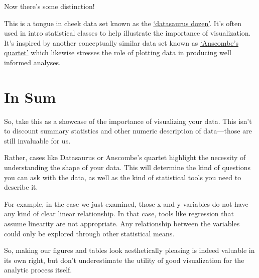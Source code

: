 \documentclass[
  letterpaper,
  DIV=11,
  numbers=noendperiod]{scrreprt}
\begin{document}
Now there's some distinction!

This is a tongue in cheek data set known as the
\href{https://jumpingrivers.github.io/datasauRus/}{`datasaurus dozen'}.
It's often used in intro statistical classes to help illustrate the
importance of visualization. It's inspired by another conceptually
similar data set known as
\href{https://en.wikipedia.org/wiki/Anscombe\%27s_quartet}{`Anscombe's
quartet'} which likewise stresses the role of plotting data in producing
well informed analyses.

\section*{In Sum}\label{in-sum}


So, take this as a showcase of the importance of visualizing your data.
This isn't to discount summary statistics and other numeric description
of data---those are still invaluable for us.

Rather, cases like Datasaurus or Anscombe's quartet highlight the
necessity of understanding the shape of your data. This will determine
the kind of questions you can ask with the data, as well as the kind of
statistical tools you need to describe it.

For example, in the case we just examined, those x and y variables do
not have any kind of clear linear relationship. In that case, tools like
regression that assume linearity are not appropriate. Any relationship
between the variables could only be explored through other statistical
means.

So, making our figures and tables look aesthetically pleasing is indeed
valuable in its own right, but don't underestimate the utility of good
visualization for the analytic process itself.
\end{document}
